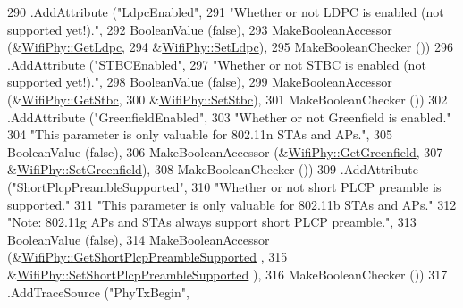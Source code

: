 \begin{DoxyCode}
290     .AddAttribute (\textcolor{stringliteral}{"LdpcEnabled"},
291                    \textcolor{stringliteral}{"Whether or not LDPC is enabled (not supported yet!)."},
292                    BooleanValue (\textcolor{keyword}{false}),
293                    MakeBooleanAccessor (&\hyperlink{classns3_1_1WifiPhy_a36c9adcf0b1f2229891c079016bfcb1b}{WifiPhy::GetLdpc},
294                                         &\hyperlink{classns3_1_1WifiPhy_a2faab5df5e4b2ea107f0dbd611513bdb}{WifiPhy::SetLdpc}),
295                    MakeBooleanChecker ())
296     .AddAttribute (\textcolor{stringliteral}{"STBCEnabled"},
297                    \textcolor{stringliteral}{"Whether or not STBC is enabled (not supported yet!)."},
298                    BooleanValue (\textcolor{keyword}{false}),
299                    MakeBooleanAccessor (&\hyperlink{classns3_1_1WifiPhy_aba80990877159beed86abcd9efcc8e13}{WifiPhy::GetStbc},
300                                         &\hyperlink{classns3_1_1WifiPhy_aa3c8fd96a62097bfb6a1f3d2ff341d24}{WifiPhy::SetStbc}),
301                    MakeBooleanChecker ())
302     .AddAttribute (\textcolor{stringliteral}{"GreenfieldEnabled"},
303                    \textcolor{stringliteral}{"Whether or not Greenfield is enabled."}
304                    \textcolor{stringliteral}{"This parameter is only valuable for 802.11n STAs and APs."},
305                    BooleanValue (\textcolor{keyword}{false}),
306                    MakeBooleanAccessor (&\hyperlink{classns3_1_1WifiPhy_ad7d61a882a8bd1ece3bcb76eeb600d28}{WifiPhy::GetGreenfield},
307                                         &\hyperlink{classns3_1_1WifiPhy_a4032e55f1488a65bda14ed0e744151df}{WifiPhy::SetGreenfield}),
308                    MakeBooleanChecker ())
309     .AddAttribute (\textcolor{stringliteral}{"ShortPlcpPreambleSupported"},
310                    \textcolor{stringliteral}{"Whether or not short PLCP preamble is supported."}
311                    \textcolor{stringliteral}{"This parameter is only valuable for 802.11b STAs and APs."}
312                    \textcolor{stringliteral}{"Note: 802.11g APs and STAs always support short PLCP preamble."},
313                    BooleanValue (\textcolor{keyword}{false}),
314                    MakeBooleanAccessor (&\hyperlink{classns3_1_1WifiPhy_ad2705695b8839425c7f728d527f66dcc}{WifiPhy::GetShortPlcpPreambleSupported}
      ,
315                                         &\hyperlink{classns3_1_1WifiPhy_a789dd4fc8853ae0f23718216f7180c80}{WifiPhy::SetShortPlcpPreambleSupported}
      ),
316                    MakeBooleanChecker ())
317     .AddTraceSource (\textcolor{stringliteral}{"PhyTxBegin"},

\end{DoxyCode}
